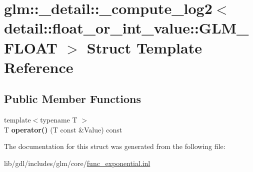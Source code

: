 \hypertarget{structglm_1_1__detail_1_1__compute__log2_3_01detail_1_1float__or__int__value_1_1_g_l_m___f_l_o_a_t_01_4}{}\section{glm\+:\+:\+\_\+detail\+:\+:\+\_\+compute\+\_\+log2$<$ detail\+:\+:float\+\_\+or\+\_\+int\+\_\+value\+:\+:G\+L\+M\+\_\+\+F\+L\+O\+A\+T $>$ Struct Template Reference}
\label{structglm_1_1__detail_1_1__compute__log2_3_01detail_1_1float__or__int__value_1_1_g_l_m___f_l_o_a_t_01_4}
\subsection*{Public Member Functions}
\begin{DoxyCompactItemize}
\item 
\hypertarget{structglm_1_1__detail_1_1__compute__log2_3_01detail_1_1float__or__int__value_1_1_g_l_m___f_l_o_a_t_01_4_a8814666ed10353997362f6fa0830ff88}{}{\footnotesize template$<$typename T $>$ }\\T {\bfseries operator()} (T const \&Value) const \label{structglm_1_1__detail_1_1__compute__log2_3_01detail_1_1float__or__int__value_1_1_g_l_m___f_l_o_a_t_01_4_a8814666ed10353997362f6fa0830ff88}

\end{DoxyCompactItemize}


The documentation for this struct was generated from the following file\+:\begin{DoxyCompactItemize}
\item 
lib/gdl/includes/glm/core/\hyperlink{func__exponential_8inl}{func\+\_\+exponential.\+inl}\end{DoxyCompactItemize}
